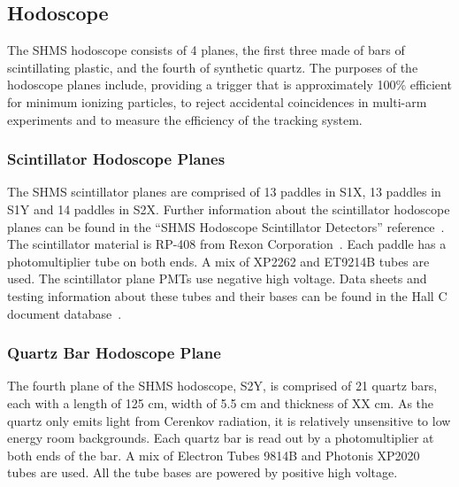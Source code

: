 \subsection{Hodoscope}
The SHMS hodoscope consists of 4 planes, the first three made of bars
of scintillating plastic, and the fourth of synthetic quartz.  The
purposes of the hodoscope planes include, providing a trigger that is
approximately 100\% efficient for minimum ionizing particles, to
reject accidental coincidences in multi-arm experiments and to measure
the efficiency of the tracking system.

\subsubsection{Scintillator Hodoscope Planes}
The SHMS scintillator planes are comprised of 13 paddles in S1X, 13
paddles in S1Y and 14 paddles in S2X.
Further information about the scintillator hodoscope planes
can be found in the ``SHMS Hodoscope Scintillator Detectors''
reference~\cite{howto:shms_scintillator_hodoscope}.
The scintillator material is
RP-408 from Rexon Corporation~\cite{rp408}.  Each paddle has a
photomultiplier tube on both ends.  A mix of XP2262 and ET9214B tubes
are used.  The scintillator plane PMTs use negative high voltage.
Data sheets and testing information about these tubes and
their bases can be found in the Hall C document
database~\cite{docdb:XP2262docs,docdb:ET9214Bdocs}.

\subsubsection{Quartz Bar Hodoscope Plane}
The fourth plane of the SHMS hodoscope, S2Y, is comprised of 21 quartz bars,
each with a length of 125 cm, width of 5.5 cm and thickness of XX cm.
As the quartz only emits light from Cerenkov radiation, it is
relatively unsensitive to low energy room backgrounds.  Each quartz
bar is read out by a photomultiplier at both ends of the bar.  A mix
of Electron Tubes 9814B and Photonis XP2020 tubes are used.  All the
tube bases are powered by positive high voltage.




